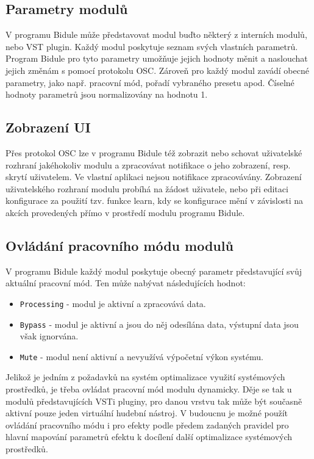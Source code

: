 \documentclass[thesis=M,czech]{FITthesis}[2019/03/06]
\begin{document}
		\subsection{Parametry modulů}
		V programu Bidule může představovat modul buďto některý z interních modulů, nebo VST plugin. Každý modul poskytuje seznam svých vlastních parametrů.
		Program Bidule pro tyto parametry umožňuje jejich hodnoty měnit a naslouchat jejich změnám s pomocí protokolu OSC.
		Zároveň pro každý modul zavádí obecné parametry, jako např. pracovní mód, pořadí vybraného presetu apod.
		Číselné hodnoty parametrů jsou normalizovány na hodnotu 1.

		\subsection{Zobrazení UI}
		Přes protokol OSC lze v programu Bidule též zobrazit nebo schovat uživatelské rozhraní jakéhokoliv modulu a zpracovávat notifikace
		o jeho zobrazení, resp. skrytí uživatelem. Ve vlastní aplikaci nejsou notifikace zpracovávány. Zobrazení uživatelského rozhraní modulu
		probíhá na žádost uživatele, nebo při editaci konfigurace za použití tzv. funkce learn, kdy se konfigurace mění v závislosti
		na akcích provedených přímo v prostředí modulu programu Bidule.

		\subsection{Ovládání pracovního módu modulů}
		V programu Bidule každý modul poskytuje obecný parametr představující svůj aktuální pracovní mód. Ten může nabývat následujících hodnot:
		\begin{itemize}
			\item \texttt{Processing} - modul je aktivní a zpracovává data.
			\item \texttt{Bypass} - modul je aktivní a jsou do něj odesílána data, výstupní data jsou však ignorvána.
			\item \texttt{Mute} - modul není aktivní a nevyužívá výpočetní výkon systému.
		\end{itemize}
		Jelikož je jedním z požadavků na systém optimalizace využití systémových prostředků, je třeba ovládat
		pracovní mód modulu dynamicky. Děje se tak u modulů představujících VSTi pluginy, pro danou vrstvu 
		tak může být současně aktivní pouze jeden virtuální hudební nástroj. V budoucnu je možné použít ovládání pracovního módu
		i pro efekty podle předem zadaných pravidel pro hlavní mapování parametrů efektu k docílení další optimalizace
		systémových prostředků.
\end{document}
